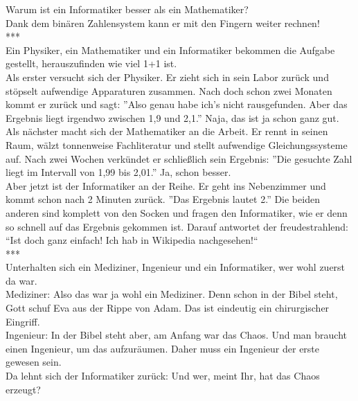 Warum ist ein Informatiker besser als ein Mathematiker? \\
Dank dem binären Zahlensystem kann er mit den Fingern weiter rechnen!\\


***\\


Ein Physiker, ein Mathematiker und ein  Informatiker bekommen die Aufgabe gestellt, herauszufinden wie viel 1+1 ist.\\
\newline
Als erster versucht sich der Physiker. Er zieht sich in sein Labor zurück und  stöpselt  aufwendige Apparaturen zusammen. Nach doch schon zwei Monaten kommt er zurück und sagt: ''Also genau habe ich’s nicht rausgefunden. Aber das Ergebnis liegt irgendwo zwischen 1,9 und 2,1.'' Naja, das ist ja schon ganz gut. \\
\newline
Als nächster macht sich der Mathematiker an die Arbeit. Er rennt in seinen Raum, wälzt  tonnenweise Fachliteratur und stellt  aufwendige Gleichungssysteme  auf. Nach zwei Wochen verkündet er  schließlich  sein Ergebnis: ''Die gesuchte Zahl liegt im Intervall von 1,99 bis 2,01.'' Ja, schon besser. \\
\newline
Aber jetzt ist der Informatiker an der Reihe. Er geht ins Nebenzimmer und kommt schon nach 2 Minuten zurück. ''Das Ergebnis lautet 2.'' Die beiden anderen sind komplett von den Socken und fragen den Informatiker, wie er denn so schnell auf das Ergebnis gekommen ist. Darauf antwortet der freudestrahlend: “Ist doch ganz einfach! Ich hab in Wikipedia nachgesehen!“\\


***\\


Unterhalten sich ein Mediziner, Ingenieur und ein Informatiker, wer wohl zuerst da war. \\
\newline
Mediziner: Also das war ja wohl ein Mediziner. Denn schon in der Bibel steht, Gott schuf Eva aus der Rippe von Adam. Das ist eindeutig ein chirurgischer Eingriff. \\
\newline
Ingenieur: In der Bibel steht aber, am Anfang war das Chaos. Und man braucht einen Ingenieur, um das aufzuräumen. Daher muss ein Ingenieur der erste gewesen sein. \\
\newline
Da lehnt sich der Informatiker zurück: Und wer, meint Ihr, hat das Chaos erzeugt?\\


